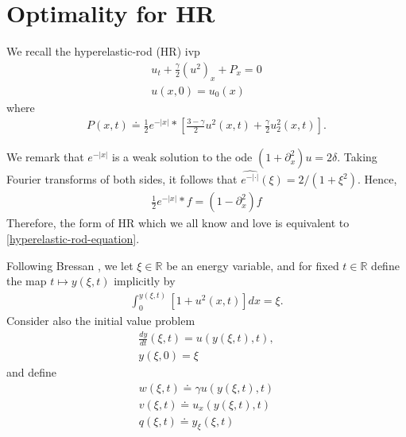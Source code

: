 \documentclass[12pt,reqno]{amsart}
\numberwithin{equation}{section}  %
\numberwithin{figure}{section}
\newcommand{\rr}{\mathbb{R}}
\newcommand{\p}{\partial}
\begin{document}
\section{Optimality for HR} 
\label{sec:op-hr}
We recall the hyperelastic-rod (HR) ivp
\begin{gather}
    \label{hr}
    u_{t} + \frac{\gamma}{2}(u^{2})_{x} + P_{x} = 0
    \\
    \label{hr-data}
    u(x,0) = u_{0}(x)
\end{gather}
where
%
%
\begin{equation*}
\begin{split}
P(x,t) \doteq \frac{1}{2}e^{-| x |} * \left [\frac{3 - \gamma}{2}
    u^{2}(x,t) + \frac{\gamma}{2} u_{2}^{2}(x,t) \right ].
\end{split}
\end{equation*}
%
\begin{framed}
We remark that $e^{-| x |}$ is a weak solution to the ode $(1 + \p_{x}^{2})u =
2\delta$. Taking Fourier transforms of both sides, it follows that
$\widehat{e^{-| \cdot |}}(\xi) = 2/(1 + \xi^{2})$. Hence,
%
%
\begin{equation*}
\begin{split}
\frac{1}{2} e^{-| x |} * f = (1 - \p_{x}^2)f
\end{split}
\end{equation*}
%
%
Therefore, the form of HR which we all know and love is equivalent to
\eqref{hyperelastic-rod-equation}.
\end{framed}
%
Following Bressan \cite{Bressan_2007_Global-conserva}, we let $\xi \in \rr$ be an energy variable, and for fixed $t \in \rr$ define the map $t \mapsto y(\xi, t)$ implicitly by 
%
%
\begin{equation}
\label{potent-def}
\begin{split}
    \int_{0}^{y(\xi, t)} [1 + u^{2}(x,t)]dx = \xi.
\end{split}
\end{equation}
%
%
Consider also the initial value problem
%
%
\begin{gather}
    \label{en-eq}
\frac{dy}{dt}(\xi, t) = u(y(\xi, t), t),
\\
\label{en-data}
y(\xi, 0) = \xi
\end{gather}
%
%
and define
\begin{gather}
    \label{var-1}
    w(\xi, t) \doteq \gamma u(y(\xi, t), t)
    \\
    \label{var-2}
    v(\xi, t) \doteq u_{x}(y(\xi, t), t)
    \\
    \label{var-3}
    q(\xi, t) \doteq y_{\xi}(\xi, t)
\end{gather}
\end{document}
